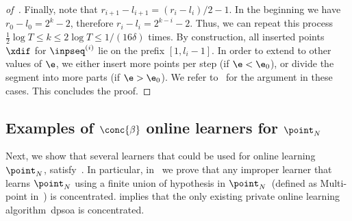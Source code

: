 \begin{proof}[of~]
    Finally, note that \(r_{i+1} - l_{i+1} = (r_i - l_i) / 2 - 1\). In the beginning we have \(r_0 - l_0 = 2^k - 2\), therefore \(r_i - l_i = 2^{k - i} - 2\). Thus, we can repeat this process \(\frac{1}{2} \log T \leq k \leq 2 \log T \leq 1/(16\delta)\) times. By construction, all inserted points \(\xdif\) for \(\inpseq^{(i)}\) lie on the prefix \([1, l_i - 1]\). In order to extend to other values of \(\e\), we either insert more points per step (if \(\e < \e_0\)), 
    or divide the segment into more parts (if \(\e > \e_0\)). We refer to~ for the argument in these cases. This concludes the proof.
\end{proof}

\subsection{Examples of \(\conc{\beta}\) online learners for \(\point_N\)}
\label{sec:example-conc}
Next, we show that several learners that could be used for online learning \(\point_N\), satisfy~. In particular, in~ we prove that any improper learner that learns \(\point_N\) using a finite union of hypothesis in \(\point_N\)~(defined as Multi-point in~) is concentrated.  implies that the only existing private online learning algorithm~\Gls{dpsoa} is concentrated.


